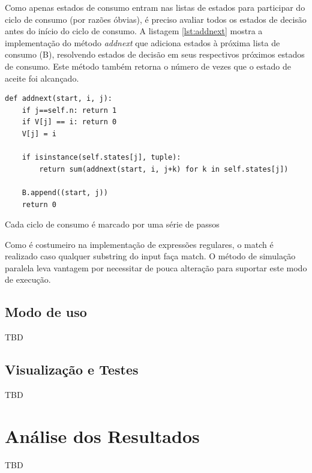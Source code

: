 \documentclass[a4paper,12pt,oneside,onecolumn]{uerj}
\begin{document}
Como apenas estados de consumo entram nas listas de estados para participar do ciclo de consumo (por razões óbvias), é preciso avaliar todos os estados de decisão antes do início do ciclo de consumo. A listagem \ref{lst:addnext} mostra a implementação do método \emph{addnext} que adiciona estados à próxima lista de consumo (B), resolvendo estados de decisão em seus respectivos próximos estados de consumo. Este método também retorna o número de vezes que o estado de aceite foi alcançado.

\vspace{0.5cm}
\begin{lstlisting}[caption={Implementação do método \emph{addnext}},label=lst:addnext]
def addnext(start, i, j):
    if j==self.n: return 1
    if V[j] == i: return 0
    V[j] = i

    if isinstance(self.states[j], tuple):
        return sum(addnext(start, i, j+k) for k in self.states[j])

    B.append((start, j))
    return 0
\end{lstlisting}

Cada ciclo de consumo é marcado por uma série de passos

Como é costumeiro na implementação de expressões regulares, o match é realizado caso qualquer substring do input faça match. O método de simulação paralela leva vantagem por necessitar de pouca alteração para suportar este modo de execução.



\section{Modo de uso}

TBD

\section{Visualização e Testes}

TBD


\chapter{Análise dos Resultados}

TBD

\end{document}
